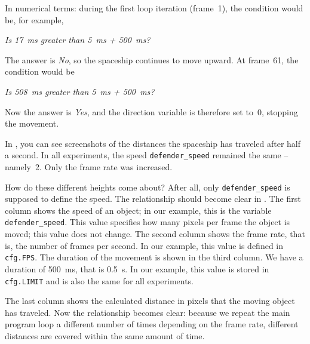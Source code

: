 In numerical terms: during the first loop iteration (frame~1), the condition would be, for example, 
 
\hspace{1cm}\emph{Is \SI{17}{ms} greater than \SI{5}{ms} + \SI{500}{ms}?}
 
The answer is \emph{No}, so the spaceship continues to move upward. At frame~61, the condition would be 

\hspace{1cm}\emph{Is \SI{508}{ms} greater than \SI{5}{ms} + \SI{500}{ms}?}

Now the answer is \emph{Yes}, and the direction variable is therefore set to~0, stopping the movement.


In , you can see screenshots of the distances the spaceship has traveled after half a second. In all experiments, the speed \texttt{defender\_speed} remained the same -- namely~2. Only the frame rate was increased.

How do these different heights come about? After all, only \texttt{defender\_speed} is supposed to define the speed. The relationship should become clear in . The first column shows the speed of an object; in our example, this is the variable \texttt{defender\_speed}. This value specifies how many pixels per frame the object is moved; this value does not change. The second column shows the frame rate, that is, the number of frames per second. In our example, this value is defined in \texttt{cfg.FPS}. The duration of the movement is shown in the third column. We have a duration of \SI{500}{ms}, that is \SI{0.5}{s}. In our example, this value is stored in \texttt{cfg.LIMIT} and is also the same for all experiments.
 
The last column shows the calculated distance in pixels that the moving object has traveled. Now the relationship becomes clear: because we repeat the main program loop a different number of times depending on the frame rate, different distances are covered within the same amount of time.


